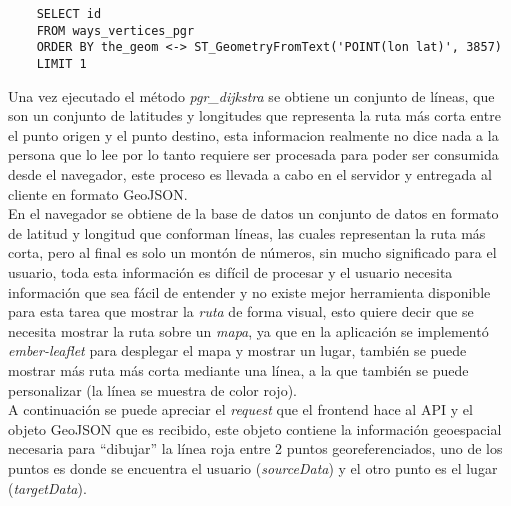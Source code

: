 \begin{verbatim}
    SELECT id
    FROM ways_vertices_pgr
    ORDER BY the_geom <-> ST_GeometryFromText('POINT(lon lat)', 3857)
    LIMIT 1
\end{verbatim}

Una vez ejecutado el método \emph{pgr\_dijkstra} se obtiene un conjunto de líneas, que son un conjunto de latitudes y longitudes que representa la ruta más corta entre el punto origen y el punto destino, esta informacion realmente no dice nada a la persona que lo lee por lo tanto requiere ser procesada para poder ser consumida desde el navegador, este proceso es llevada a cabo en el servidor y entregada al cliente en formato GeoJSON.\\







En el navegador se obtiene
de la base de datos un conjunto de datos en formato de latitud y longitud que conforman líneas, las cuales representan la ruta más corta, pero al final es solo un montón de números, sin mucho significado para el usuario, toda esta información es difícil de procesar y el usuario necesita información que sea fácil de entender y no existe mejor herramienta disponible para esta tarea que mostrar la \emph{ruta} de forma visual, esto quiere decir que se necesita mostrar la ruta sobre un \emph{mapa}, ya que en la aplicación se implementó \emph{ember-leaflet} para desplegar el mapa y mostrar un lugar, también se puede  mostrar más ruta más corta mediante una línea, a la que también se puede personalizar (la línea se muestra de color rojo).\\

A continuación se puede apreciar el \emph{request} que el frontend hace al API y  el objeto GeoJSON que es recibido, este objeto contiene la información geoespacial necesaria para ``dibujar'' la línea roja entre 2 puntos georeferenciados, uno de los puntos es donde se encuentra el usuario (\emph{sourceData}) y el otro punto es el lugar (\emph{targetData}).


